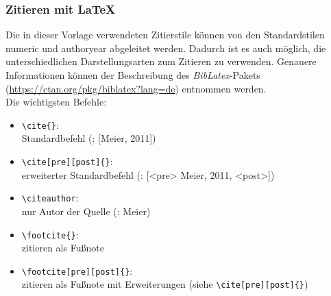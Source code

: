 \subsubsection{Zitieren mit \LaTeX}
Die in dieser Vorlage verwendeten Zitierstile können von den Standardstilen \textsf{numeric} und \textsf{authoryear} abgeleitet werden. Dadurch ist es auch möglich, die unterschiedlichen Darstellungsarten zum Zitieren zu verwenden. Genauere Informationen können der Beschreibung des \textit{BibLatex}-Pakets (\url{https://ctan.org/pkg/biblatex?lang=de}) entnommen werden.\newline
\\Die wichtigsten Befehle:
\begin{itemize}
	\item \verb|\cite{}|:\\ Standardbefehl (\zB: [Meier, 2011])
	\item \verb|\cite[pre][post]{}|:\\ erweiterter Standardbefehl (\zB: [<pre> Meier, 2011, <post>])
	\item \verb|\citeauthor|:\\ nur Autor der Quelle (\zB: Meier)
	\item \verb|\footcite{}|:\\ zitieren als Fußnote
	\item \verb|\footcite[pre][post]{}|:\\ zitieren als Fußnote mit Erweiterungen (siehe \verb|\cite[pre][post]{}|)
\end{itemize}

